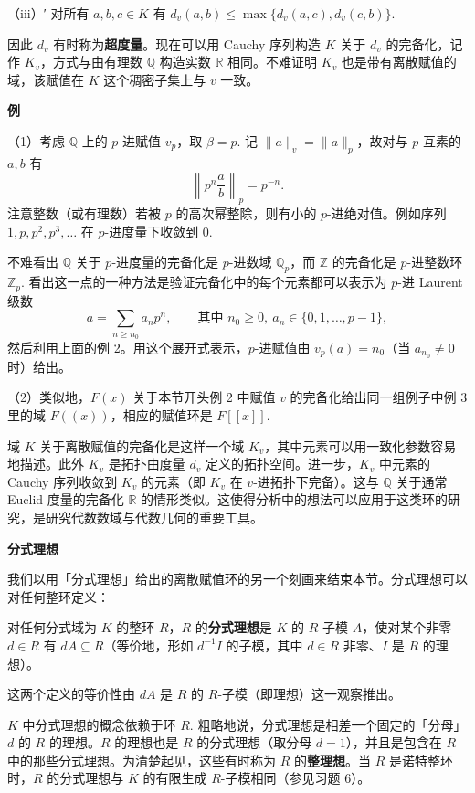 （iii）′ 对所有 \(a, b, c \in K\) 有 \(d_v(a,b) \leq \max\{d_v(a,c), d_v(c,b)\}\).

因此 \(d_v\) 有时称为\textbf{超度量}。现在可以用 Cauchy 序列构造 \(K\) 关于 \(d_v\) 的完备化，记作 \(K_v\)，方式与由有理数 \(\mathbb{Q}\) 构造实数 \(\mathbb{R}\) 相同。不难证明 \(K_v\) 也是带有离散赋值的域，该赋值在 \(K\) 这个稠密子集上与 \(v\) 一致。

\noindent\textbf{例}

（1）考虑 \(\mathbb{Q}\) 上的 \(p\)-进赋值 \(v_p\)，取 \(\beta = p\). 记 \(\|a\|_v = \|a\|_p\)，故对与 \(p\) 互素的 \(a, b\) 有
\[
\left\|p^n\frac{a}{b}\right\|_p = p^{-n}.
\]
注意整数（或有理数）若被 \(p\) 的高次幂整除，则有小的 \(p\)-进绝对值。例如序列 \(1, p, p^2, p^3, \ldots\) 在 \(p\)-进度量下收敛到 0.

不难看出 \(\mathbb{Q}\) 关于 \(p\)-进度量的完备化是 \(p\)-进数域 \(\mathbb{Q}_p\)，而 \(\mathbb{Z}\) 的完备化是 \(p\)-进整数环 \(\mathbb{Z}_p\). 看出这一点的一种方法是验证完备化中的每个元素都可以表示为 \(p\)-进 Laurent 级数
\[
a = \sum_{n \geq n_0}a_np^n, \qquad \text{其中 } n_0 \geq 0,\ a_n \in \{0, 1, \ldots, p-1\},
\]
然后利用上面的例 2。用这个展开式表示，\(p\)-进赋值由 \(v_p(a) = n_0\)（当 \(a_{n_0} \neq 0\) 时）给出。

（2）类似地，\(F(x)\) 关于本节开头例 2 中赋值 \(v\) 的完备化给出同一组例子中例 3 里的域 \(F((x))\)，相应的赋值环是 \(F[[x]]\).

域 \(K\) 关于离散赋值的完备化是这样一个域 \(K_v\)，其中元素可以用一致化参数容易地描述。此外 \(K_v\) 是拓扑由度量 \(d_v\) 定义的拓扑空间。进一步，\(K_v\) 中元素的 Cauchy 序列收敛到 \(K_v\) 的元素（即 \(K_v\) 在 \(v\)-进拓扑下完备）。这与 \(\mathbb{Q}\) 关于通常 Euclid 度量的完备化 \(\mathbb{R}\) 的情形类似。这使得分析中的想法可以应用于这类环的研究，是研究代数数域与代数几何的重要工具。

\noindent\textbf{分式理想}

我们以用「分式理想」给出的离散赋值环的另一个刻画来结束本节。分式理想可以对任何整环定义：

\begin{definition}
对任何分式域为 \(K\) 的整环 \(R\)，\(R\) 的\textbf{分式理想}是 \(K\) 的 \(R\)-子模 \(A\)，使对某个非零 \(d \in R\) 有 \(dA \subseteq R\)（等价地，形如 \(d^{-1}I\) 的子模，其中 \(d \in R\) 非零、\(I\) 是 \(R\) 的理想）。
\end{definition}

这两个定义的等价性由 \(dA\) 是 \(R\) 的 \(R\)-子模（即理想）这一观察推出。

\(K\) 中分式理想的概念依赖于环 \(R\). 粗略地说，分式理想是相差一个固定的「分母」\(d\) 的 \(R\) 的理想。\(R\) 的理想也是 \(R\) 的分式理想（取分母 \(d = 1\)），并且是包含在 \(R\) 中的那些分式理想。为清楚起见，这些有时称为 \(R\) 的\textbf{整理想}。当 \(R\) 是诺特整环时，\(R\) 的分式理想与 \(K\) 的有限生成 \(R\)-子模相同（参见习题 6）。


